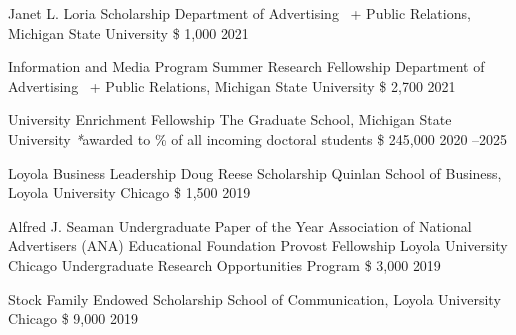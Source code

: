 \begin{cvhonors}
  \cvhonor
    {Janet L. Loria Scholarship} %
    {Department of Advertising \ +  Public Relations, Michigan State University} %
    {\$ 1,000} %
    {2021} %

  \cvhonor
    {Information and Media Program Summer Research Fellowship} 
    {Department of Advertising \ +  Public Relations,
    Michigan State University } 
    {\$ 2,700} 
    {2021} 
    
      \cvhonor
    {University Enrichment Fellowship} %
    {The Graduate School, Michigan State University \scriptsize{\textit{*}awarded to  \% of all incoming doctoral students}} %
    {\$ 245,000} %
    {2020 --2025} %
    
\end{cvhonors}

\begin{cvhonors}

  \cvhonor
    {Loyola Business Leadership Doug Reese Scholarship} %
   {Quinlan School of Business, Loyola University Chicago
} %
    {\$ 1,500} %
    {2019} %

\cvhonor
    {Alfred J. Seaman Undergraduate Paper of the Year} %
    {Association of National Advertisers (ANA) Educational Foundation
} %
    {} %
    {} %
  \cvhonor
    {Provost Fellowship} 
    {Loyola University Chicago Undergraduate Research Opportunities Program } 
    {\$ 3,000} 
    {2019} 
\end{cvhonors}

\begin{cvhonors}

  \cvhonor
    {Stock Family Endowed Scholarship} %
    {School of Communication, Loyola University Chicago} %
    {\$ 9,000} %
    {2019} %
\end{cvhonors}

